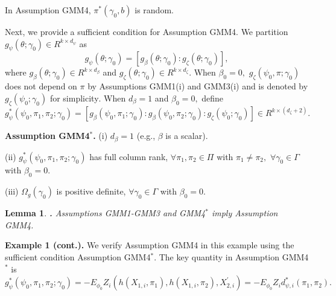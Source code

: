 \documentclass[12pt,thmsb,titlepage,final,oneside,letterpaper]{article}
\newtheorem{lemma}{Lemma}[section]
\begin{document}
In Assumption GMM4, $\pi ^{\ast }(\gamma _{0},b)$ is random.

Next, we provide a sufficient condition for Assumption GMM4. We partition $%
g_{\psi }(\theta ;\gamma _{0})\allowbreak \in R^{k\times d_{\psi }}$ as%
\begin{equation}
g_{\psi }(\theta ;\gamma _{0})=[g_{\beta }(\theta ;\gamma _{0}):g_{\zeta
}(\theta ;\gamma _{0})],
\end{equation}%
where $g_{\beta }(\theta ;\gamma _{0})\in R^{k\times d_{\beta }}$ and $%
g_{\zeta }(\theta ;\gamma _{0})\in R^{k\times d_{\zeta }}.$ When $\beta
_{0}=0,$ $g_{\zeta }(\psi _{0},\pi ;\gamma _{0})$ does not depend on $\pi $
by Assumptions GMM1(i) and GMM3(i) and is denoted by $g_{\zeta }(\psi
_{0};\gamma _{0})$ for simplicity$.$ When $d_{\beta }=1$ and $\beta _{0}=0,$
define 
\begin{equation}
g_{\psi }^{\ast }(\psi _{0},\pi _{1},\pi _{2};\gamma _{0})=[g_{\beta }(\psi
_{0},\pi _{1};\gamma _{0}):g_{\beta }(\psi _{0},\pi _{2};\gamma
_{0}):g_{\zeta }(\psi _{0};\gamma _{0})]\in R^{k\times (d_{\zeta }+2)}.
\end{equation}

\noindent \textbf{Assumption GMM4}$^{\ast }$\textbf{.} (i) $d_{\beta }=1$
(e.g., $\beta $ is a scalar).

\noindent (ii) $g_{\psi }^{\ast }(\psi _{0},\pi _{1},\pi _{2};\gamma _{0})$
has full column rank, $\forall \pi _{1},\pi _{2}\in \Pi $ with $\pi _{1}\neq
\pi _{2},$ $\forall \gamma _{0}\in \Gamma $ with $\beta _{0}=0.$

\noindent (iii) $\Omega _{g}(\gamma _{0})$ is positive definite, $\forall
\gamma _{0}\in \Gamma $ with $\beta _{0}=0.$\medskip

\begin{lemma}
\hspace{-0.08in}\textbf{.} \label{Lemma As GMM4}Assumptions \emph{GMM1-GMM3 }%
and \emph{GMM4}$^{\ast }$ imply Assumption \emph{GMM4.}
\end{lemma}

\noindent \textbf{Example 1 (cont.). }We verify Assumption GMM4 in this
example using the sufficient condition Assumption GMM4$^{\ast }.$ The key
quantity in Assumption GMM4$^{\ast }$ is 
\begin{equation}
g_{\psi }^{\ast }(\psi _{0},\pi _{1},\pi _{2};\gamma _{0})=-E_{\phi
_{0}}Z_{i}(h(X_{1,i},\pi _{1}),h(X_{1,i},\pi _{2}),X_{2,i}^{\prime
})=-E_{\phi _{0}}Z_{i}d_{\psi ,i}^{\ast }(\pi _{1},\pi _{2}).
\end{equation}
\end{document}
